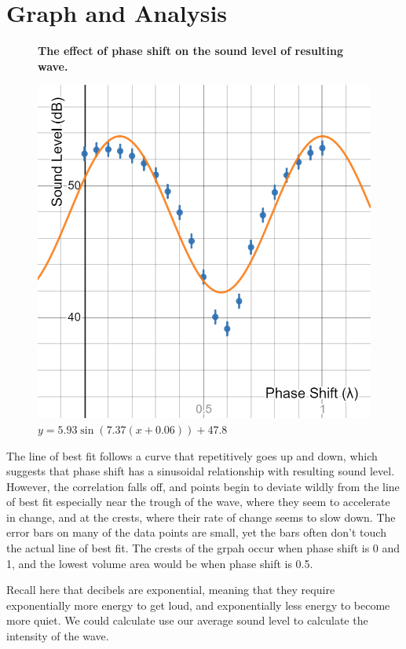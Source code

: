 \documentclass[index]{subfiles}
\begin{document}
\section{Graph and Analysis}

\begin{figure}[H]
    \centering
    \textbf{The effect of phase shift on the sound level of resulting wave.}\medskip\par
    \includegraphics[scale=0.3]{res/graph.png}
    \caption{\(y=5.93\sin\left(7.37\left(x+0.06\right)\right)+47.8\) }
\end{figure}

The line of best fit follows a curve that repetitively goes up and down, which suggests that phase shift has a sinusoidal relationship with resulting sound level. However, the correlation falls off, and points begin to deviate wildly from the line of best fit especially near the trough of the wave, where they seem to accelerate in change, and at the crests, where their rate of change seems to slow down. The error bars on many of the data points are small, yet the bars often don't touch the actual line of best fit. The crests of the grpah occur when phase shift is 0 and 1, and the lowest volume area would be when phase shift is 0.5.

Recall here that decibels are exponential, meaning that they require exponentially more energy to get loud, and exponentially less energy to become more quiet. We could calculate use our average sound level to calculate the intensity of the wave.
\end{document}
